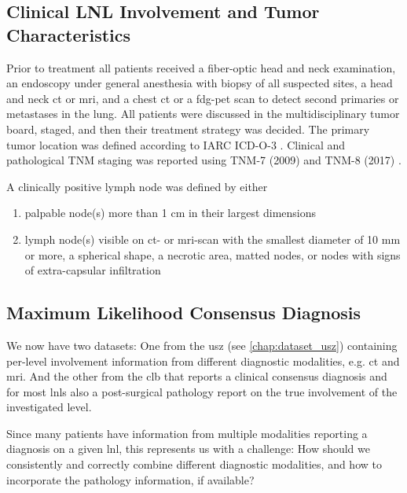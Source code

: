 \documentclass[\relativeRoot/main.tex]{subfiles}
\begin{document}
\subsection*{Clinical LNL Involvement and Tumor Characteristics}
\label{subsec:dataset_clb:methods:involvement}

Prior to treatment all patients received a fiber-optic head and neck examination, an endoscopy under general anesthesia with biopsy of all suspected sites, a head and neck \gls{ct} or \gls{mri}, and a chest \gls{ct} or a \gls{fdg-pet} scan to detect second primaries or metastases in the lung. All patients were discussed in the multidisciplinary tumor board, staged, and then their treatment strategy was decided. The primary tumor location was defined according to IARC ICD-O-3 \cite{fritz_international_2000}. Clinical and pathological TNM staging was reported using TNM-7 (2009) and TNM-8 (2017) \cite{brierley_tnm_2017}.

A clinically positive lymph node was defined by either

\begin{enumerate}[label={\alph*)}]
    \item palpable node(s) more than 1 cm in their largest dimensions
    \item lymph node(s) visible on \gls{ct}- or \gls{mri}-scan with the smallest diameter of 10 mm or more, a spherical shape, a necrotic area, matted nodes, or nodes with signs of extra-capsular infiltration
\end{enumerate}

\subsection*{Maximum Likelihood Consensus Diagnosis}
\label{subsec:dataset_clb:methods:max_llh}

We now have two datasets: One from the \gls{usz} (see \cref{chap:dataset_usz}) containing per-level involvement information from different diagnostic modalities, e.g. \gls{ct} and \gls{mri}. And the other from the \gls{clb} that reports a clinical consensus diagnosis and for most \glspl{lnl} also a post-surgical pathology report on the true involvement of the investigated level.

Since many patients have information from multiple modalities reporting a diagnosis on a given \gls{lnl}, this represents us with a challenge: How should we consistently and correctly combine different diagnostic modalities, and how to incorporate the pathology information, if available?
\end{document}
